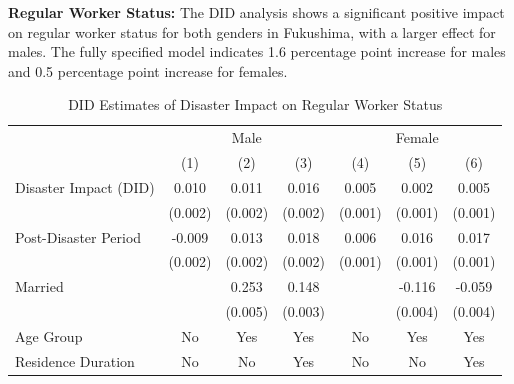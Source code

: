\documentclass[serif, aspectratio=169]{beamer}
\begin{document}
\begin{frame}[label=regular_status]

\textbf{Regular Worker Status:} The DID analysis shows a significant positive impact on regular worker status for both genders in Fukushima, with a larger effect for males. The fully specified model indicates 1.6 percentage point increase for males and 0.5 percentage point increase for females.

\begin{table}[htbp]
\centering
\caption{DID Estimates of Disaster Impact on Regular Worker Status}

\vspace{-0.2cm}


\begin{tabular}{@{}l*{6}{c}@{}}
          &\multicolumn{3}{c}{Male}                                &\multicolumn{3}{c}{Female}                              \\\cmidrule(lr){2-4}\cmidrule(lr){5-7}
          &\multicolumn{1}{c}{(1)}         &\multicolumn{1}{c}{(2)}         &\multicolumn{1}{c}{(3)}         &\multicolumn{1}{c}{(4)}         &\multicolumn{1}{c}{(5)}         &\multicolumn{1}{c}{(6)}         \\
\toprule
Disaster Impact (DID)&    0.010\sym{***}&    0.011\sym{***}&    0.016\sym{***}&    0.005\sym{***}&    0.002         &    0.005\sym{***}\\
          &  (0.002)         &  (0.002)         &  (0.002)         &  (0.001)         &  (0.001)         &  (0.001)         \\
\addlinespace
Post-Disaster Period&   -0.009\sym{***}&    0.013\sym{***}&    0.018\sym{***}&    0.006\sym{***}&    0.016\sym{***}&    0.017\sym{***}\\
          &  (0.002)         &  (0.002)         &  (0.002)         &  (0.001)         &  (0.001)         &  (0.001)         \\
\addlinespace
Married   &                  &    0.253\sym{***}&    0.148\sym{***}&                  &   -0.116\sym{***}&   -0.059\sym{***}\\
          &                  &  (0.005)         &  (0.003)         &                  &  (0.004)         &  (0.004)         \\
\midrule
Age Group &       No         &      Yes         &      Yes         &       No         &      Yes         &      Yes         \\
Residence Duration&       No         &       No         &      Yes         &       No         &       No         &      Yes         \\

\end{tabular}
\end{table}
\end{frame}
\end{document}
